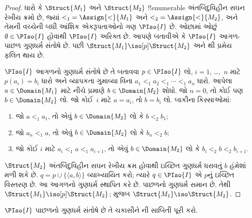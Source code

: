 \documentclass[../../../include/open-logic-section]{subfiles}
\begin{document}
\begin{proof}
  ધારો કે $\Struct{M_1}$ અને $\Struct{M_2}$ !!{enumerable}
  અંતબિંદુવિહીન સઘન રેખીય ક્રમો છે, જ્યાં ${<_1} = \Assign{<}{M_1}$ અને
  ${<_2} = \Assign{<}{M_2}$, અને તેમની વચ્ચેની બધી આંશિક એકરૂપતાઓનો
  ગણ $\PIso{I}$ છે. ઓછામાં ઓછું $\emptyset \in \PIso{I}$ હોવાથી
  $\PIso{I}$ અરિક્ત છે. આપણે બતાવીએ કે $\PIso{I}$ આગળ-પાછળ ગુણધર્મ
  સંતોષે છે. પછી $\Struct{M_1} \iso[p] \Struct{M_2}$ અને
  થી પ્રમેય ફલિત થાય છે.

  $\PIso{I}$ આગળનો ગુણધર્મ સંતોષે છે તે બતાવવા $p \in \PIso{I}$ લો,
  $i = 1$, \dots,~$n$ માટે $p(a_i) = b_i$ ધારો અને વ્યાપકતા ગુમાવ્યા
  વિના $a_1 <_1 a_2 <_1 \cdots <_1 a_n$ ધારો. આપેલા
  $a \in \Domain{M_1}$ માટે નીચે પ્રમાણે $b \in \Domain{M_2}$ શોધો.
  જો $n=0$, તો કોઈ પણ $b \in \Domain{M_2}$ લો. જો કોઈ~$i$ માટે
  $a=a_i$, તો $b=b_i$ લો. બાકીના કિસ્સાઓમાં:
  \begin{enumerate}
  \item જો $a <_1 a_1$, તો એવું $b \in \Domain{M_2}$ લો કે
    $b <_2 b_1$;
  \item જો $a_n <_1 a$, તો એવું $b \in \Domain{M_2}$ લો કે
    $b_n <_2 b$;
 \item જો કોઈ $i$ માટે $a_i <_1 a <_1 a_{i+1}$, તો એવું
   $b \in \Domain{M_2}$ લો કે $b_i <_2 b <_2 b_{i+1}$.
  \end{enumerate}
  $\Struct{M_2}$ અંતબિંદુવિહીન સઘન રેખીય ક્રમ હોવાથી ઇચ્છિત ગુણધર્મ
  ધરાવતું $b$ હંમેશાં મળી શકે છે. $q = p \cup \{ \langle a, b \rangle \}$
  વ્યાખ્યાયિત કરો; ત્યારે $q \in \PIso{I}$ એ $p$નું ઇચ્છિત વિસ્તરણ છે.
  આ આગળનો ગુણધર્મ સ્થાપિત કરે છે. પાછળનો ગુણધર્મ સમાન છે. તેથી
  $\Struct{M_1} \iso[p] \Struct{M_2}$;  મુજબ
  $\Struct{M_1} \iso \Struct{M_2}$.
\end{proof}

\begin{prob}
  $\PIso{I}$ પાછળનો ગુણધર્મ સંતોષે છે તે ચકાસીને
  ની સાબિતી પૂરી કરો.
\end{prob}
\end{document}
